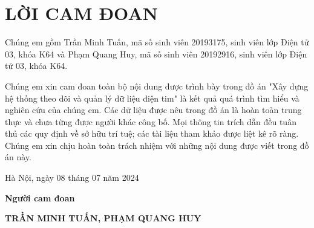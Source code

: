 \section*{LỜI CAM ĐOAN} %
\thispagestyle{empty}

Chúng em gồm Trần Minh Tuấn, mã số sinh viên 20193175, sinh viên lớp Điện tử 03, khóa K64 và Phạm Quang Huy, mã số sinh viên 20192916, sinh viên lớp Điện tử 03, khóa K64.

Chúng em xin cam đoan toàn bộ nội dung được trình bày trong đồ án "Xây dựng hệ thống theo dõi và quản lý dữ liệu điện tim" là kết quả quá trình tìm hiểu và
nghiên cứu của chúng em. Các dữ liệu được nêu trong đồ án là hoàn toàn trung thực
và chưa từng được người khác công bố. Mọi thông tin trích dẫn đều tuân thủ các quy
định về sở hữu trí tuệ; các tài liệu tham khảo được liệt kê rõ ràng. Chúng em xin
chịu hoàn toàn trách nhiệm với những nội dung được viết trong đồ án này.


\vspace{6pt}

\hspace{8cm}Hà Nội, ngày 08 tháng 07 năm 2024

\hspace{9cm}\textbf{Người cam đoan}

\vspace{2cm}
\hspace{7cm}\textbf{TRẦN MINH TUẤN,  PHẠM QUANG HUY}

\cleardoublepage